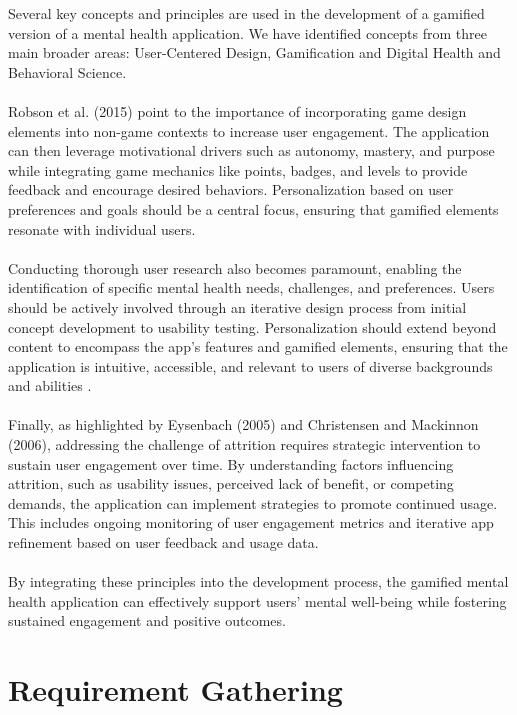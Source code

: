 \documentclass[manuscript,screen,review]{acmart}
\begin{document}
Several key concepts and principles are used in the development of a gamified version of a mental health application. We have identified concepts from three main broader areas: User-Centered Design, Gamification and Digital Health and Behavioral Science. 
\\ \\
Robson et al. \cite{Robson15} (2015) point to the importance of incorporating game design elements into non-game contexts to increase user engagement. The application can then leverage motivational drivers such as autonomy, mastery, and purpose while integrating game mechanics like points, badges, and levels to provide feedback and encourage desired behaviors. Personalization based on user preferences and goals should be a central focus, ensuring that gamified elements resonate with individual users.
\\ \\
Conducting thorough user research also becomes paramount, enabling the identification of specific mental health needs, challenges, and preferences. Users should be actively involved through an iterative design process from initial concept development to usability testing. Personalization should extend beyond content to encompass the app's features and gamified elements, ensuring that the application is intuitive, accessible, and relevant to users of diverse backgrounds and abilities \cite{Schnall16}.
\\ \\
Finally, as highlighted by Eysenbach \cite{Eysenbach05} (2005) and Christensen and Mackinnon \cite{Christensen06} (2006), addressing the challenge of attrition requires strategic intervention to sustain user engagement over time. By understanding factors influencing attrition, such as usability issues, perceived lack of benefit, or competing demands, the application can implement strategies to promote continued usage. This includes ongoing monitoring of user engagement metrics and iterative app refinement based on user feedback and usage data. 
\\ \\
By integrating these principles into the development process, the gamified mental health application can effectively support users' mental well-being while fostering sustained engagement and positive outcomes.




\section{Requirement Gathering}
\end{document}

